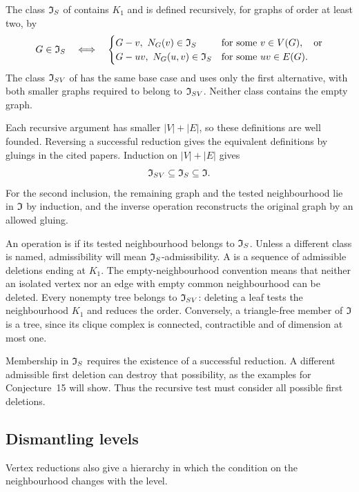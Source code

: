 \begin{definition}\label{def:IS}
The class $\mathfrak I_S$ of  contains $K_1$
and is defined recursively, for graphs of order at least two, by
\[
 G\in\mathfrak I_S\quad\Longleftrightarrow\quad
 \begin{cases}
 G-v,\ N_G(v)\in\mathfrak I_S&\text{for some }v\in V(G),\quad\text{or}\\
 G-uv,\ N_G(u,v)\in\mathfrak I_S&\text{for some }uv\in E(G).
 \end{cases}
\]
The class $\mathfrak I_{SV}$ of  has the
same base case and uses only the first alternative, with both smaller
graphs required to belong to $\mathfrak I_{SV}$. Neither class contains the empty
graph.
\end{definition}

Each recursive argument has smaller $|V|+|E|$, so these definitions are
well founded. Reversing a successful reduction gives the equivalent
definitions by gluings in the cited papers. Induction on $|V|+|E|$
gives
\begin{equation}\label{eq:strong-inclusions}
 \mathfrak I_{SV}\subseteq\mathfrak I_S\subseteq\mathfrak I.
\end{equation}
For the second inclusion, the remaining graph and the tested
neighbourhood lie in $\mathfrak I$ by induction, and the inverse operation
reconstructs the original graph by an allowed gluing.

An operation is  if its tested neighbourhood
belongs to $\mathfrak I_S$. Unless a different class is named, admissibility
will mean $\mathfrak I_S$-admissibility. A  is a sequence
of admissible deletions ending at $K_1$. The empty-neighbourhood
convention means that neither an isolated vertex nor an edge with empty
common neighbourhood can be deleted. Every nonempty tree belongs to
$\mathfrak I_{SV}$: deleting a leaf tests the neighbourhood $K_1$ and reduces the
order. Conversely, a triangle-free member of $\mathfrak I$ is a tree, since
its clique complex is connected, contractible and of dimension at most one.

Membership in $\mathfrak I_S$ requires the existence of a successful reduction.
A different admissible first deletion can destroy that possibility,
as the examples for Conjecture~15 will show. Thus the recursive test
must consider all possible first deletions.

\subsection{Dismantling levels}
Vertex reductions also give a hierarchy in which the condition on the
neighbourhood changes with the level.

